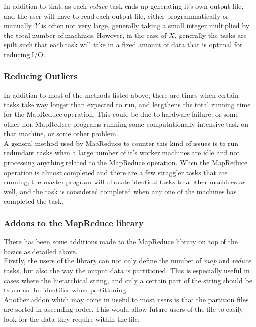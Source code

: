 \documentclass[]{article}
\begin{document}
In addition to that, as each \emph{reduce} task ends up generating it's own output file, and the user will have to read each output file, either programmatically or manually, $Y$ is often not very large, generally taking a small integer multiplied by the total number of machines. However, in the case of $X$, generally the tasks are spilt such that each task will take in a fixed amount of data that is optimal for reducing I/O.\\

\subsubsection{Reducing Outliers}
In addition to most of the methods listed above, there are times when certain tasks take way longer than expected to run, and lengthens the total running time for the MapReduce operation. This could be due to hardware failure, or some other non-MapReduce programs running some computationally-intensive task on that machine, or some other problem. \\

A general method used by MapReduce to counter this kind of issues is to run redundant tasks when a large number of it's worker machines are idle and not processing anything related to the MapReduce operation. When the MapReduce operation is almost completed and there are a few straggler tasks that are running, the master program will allocate identical tasks to a other machines as well, and the task is considered completed when any one of the machines has completed the task. \\

\subsubsection{Addons to the MapReduce library}
There has been some additions made to the MapReduce library on top of the basics as detailed above.\\

Firstly, the users of the library can not only define the number of \emph{map} and \emph{reduce} tasks, but also the way the output data is partitioned. This is especially useful in cases where the hierarchical string, and only a certain part of the string should be taken as the identifier when partitioning.\\

Another addon which may come in useful to most users is that the partition files are sorted in ascending order. This would allow future users of the file to easily look for the data they require within the file.
\end{document}
